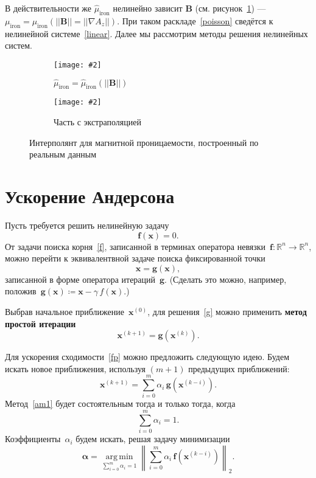 \documentclass[a4paper, 14pt]{extarticle}
\newcommand{\includegraphicsw}[2][1.]{\texttt{[image: \#2]}}
\DeclareMathOperator{\argmin}{arg\,min}
\newcommand{\vect}[1]{\boldsymbol{\mathbf{#1}}}
\begin{document}
	В действительности же $\hat\mu_{\text{iron}}$ нелинейно зависит $\vect B$ (см. рисунок~\ref{mu}) --- $\mu_{\text{iron}} = \mu_{\text{iron}}(||\vect B|| = ||\nabla A_z||)$. При таком раскладе~\eqref{poisson} сведётся к нелинейной системе~\eqref{linear}. Далее мы рассмотрим методы решения нелинейных систем. 
	
	\begin{figure}[b!]
		\centering
		\begin{subfigure}{.45\linewidth}
			\centering
			\includegraphicsw{interp.pdf}
			\caption{$\hat\mu_{\text{iron}} = \hat{\mu}_{\text{iron}}(||\vect B||)$}
		\end{subfigure}%
		\hfill
		\begin{subfigure}{.45\linewidth}
			\centering
			\includegraphicsw{extrap.pdf}
			\caption{Часть с экстраполяцией}
		\end{subfigure}
		\caption{Интерполянт для магнитной проницаемости, построенный по реальным данным}
		\label{mu}
	\end{figure}
	
	\section{Ускорение Андерсона}
	
	Пусть требуется решить нелинейную задачу
	\begin{equation}\label{f}
		\vect f(\vect x) = 0.
	\end{equation}
	От задачи поиска корня~\eqref{f}, записанной в терминах оператора невязки~$\vect f : \mathbb R^n \rightarrow \mathbb R^n$, можно перейти к эквивалентвной задаче поиска фиксированной точки
	\begin{equation}\label{g}
		\vect x = \vect g(\vect x),
	\end{equation}
	записанной в форме оператора итераций~$\vect g$. (Сделать это можно, например, положив~$\vect g(\vect x) \coloneqq \vect x - \gamma\,f(\vect x)$.)
	
	Выбрав начальное приближение~$\vect x^{(0)}$, для решения~\eqref{g} можно применить \textbf{метод простой итерации}
	\begin{equation}\label{fp}
		\vect x^{(k+1)} = \vect g(\vect x^{(k)}).
	\end{equation}
	
	Для ускорения сходимости~\eqref{fp} можно предложить следующую идею. Будем искать новое приближения, используя $(m + 1)$ предыдущих приближений:
	\begin{equation}\label{am1}
		\vect x^{(k+1)} = \sum_{i=0}^m \alpha_i\,\vect g(\vect x^{(k-i)}).
	\end{equation}
	Метод~\eqref{am1} будет состоятельным тогда и только тогда, когда 
	\begin{equation}\label{am2}
		\sum_{i=0}^m \alpha_i = 1.
	\end{equation}
	Коэффициенты~$\alpha_i$ будем искать, решая задачу минимизации
	\begin{equation}\label{am3}
		\vect\alpha = \underset{\sum_{i=0}^m \alpha_i = 1}{\argmin} \left\lVert \sum_{i=0}^m \alpha_i\,\vect f(\vect x^{(k-i)}) \right\lVert_2.
	\end{equation}
	
\end{document}
